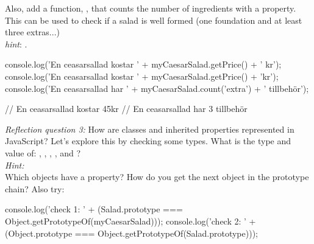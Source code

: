 \documentclass[fleqn, article, a4paper]{memoir}
\begin{document}
\begin{Assignments}
Also, add a function, , that counts the number of ingredients with a property. This can be used to check if a salad is well formed (one foundation and at least three extras...)
\\ \emph{hint}: .
\begin{Code}
console.log('En ceasarsallad kostar ' + myCaesarSalad.getPrice() + ' kr\n');
console.log('En ceasarsallad kostar ' + myCaesarSalad.getPrice() + 'kr');
console.log('En ceasarsallad har ' + myCaesarSalad.count('extra') + ' tillbehör');

// En ceasarsallad kostar 45kr
// En ceasarsallad har 3 tillbehör
\end{Code}
\emph{Reflection question 3:} How are classes and inherited properties represented in JavaScript? Let's explore this by checking some types. What is the type and value of: , , , , and ?
\\ \emph{Hint: } 
\\Which objects have a  property? How do you get the next object in the prototype chain? Also try:
\begin{Code}
console.log('check 1: ' + 
  (Salad.prototype === Object.getPrototypeOf(myCaesarSalad)));
console.log('check 2: ' + 
  (Object.prototype === Object.getPrototypeOf(Salad.prototype)));
 \end{Code}


\end{Assignments}
\end{document}
